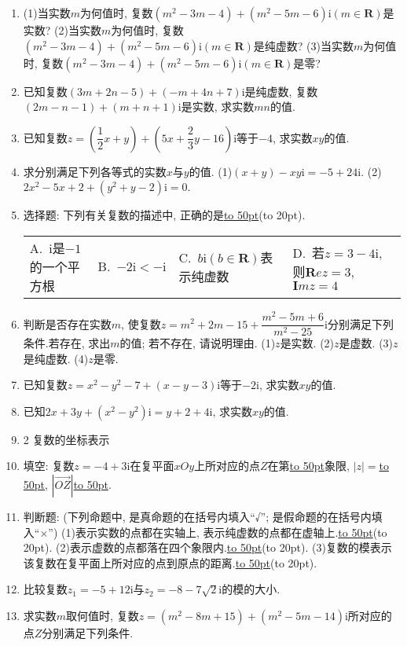 \documentclass[10pt,a4paper]{article}
\newcommand{\blank}[1]{\underline{\hbox to #1pt{}}}
\newcommand{\bracket}[1]{(\hbox to #1pt{})}
\newcommand{\fourch}[4]{\par\begin{tabular}{p{.23\textwidth}p{.23\textwidth}p{.23\textwidth}p{.23\textwidth}}
A.~#1 &B.~#2& C.~#3& D.~#4
\end{tabular}}
\begin{document}
\begin{enumerate}[1.]
\fourch{$a=0,b\ne 0$}{$a\ne 0,b\in \mathbf{R}$}{$a\ne 0,b\ne 0$}{$a\in \mathbf{R},b\ne 0$}
(2)已知复数$z_1=a+b\mathrm{i}(ab\in \mathbf{R})$和复数$z_2=c+d\mathrm{i}(cd\in \mathbf{R})$.``$a=c$''是``$z_1=z_2$''的\blank{50}\bracket{20}.
\fourch{充分非必要条件}{必要非充分条件}{充要条件}{既非充分又非必要条件}
\item (1)当实数$m$为何值时, 复数$(m^2-3m-4)+(m^2-5m-6)\mathrm{i}(m\in \mathbf{R})$是实数?
(2)当实数$m$为何值时, 复数$(m^2-3m-4)+(m^2-5m-6)\mathrm{i}(m\in \mathbf{R})$是纯虚数?
(3)当实数$m$为何值时, 复数$(m^2-3m-4)+(m^2-5m-6)\mathrm{i}(m\in \mathbf{R})$是零?
\item 已知复数$(3m+2n-5)+(-m+4n+7)\mathrm{i}$是纯虚数, 复数$(2m-n-1)+(m+n+1)\mathrm{i}$是实数, 求实数$mn$的值.
\item 已知复数$z=(\dfrac 12x+y)+(5x+\dfrac 23y-16)\mathrm{i}$等于$-4$, 求实数$xy$的值.
\item 求分别满足下列各等式的实数$x$与$y$的值.
(1)$(x+y)-xy\mathrm{i}=-5+24\mathrm{i}$.
(2)$2x^2-5x+2+(y^2+y-2)\mathrm{i}=0$.
\item 选择题:
下列有关复数的描述中, 正确的是\blank{50}\bracket{20}.
\fourch{$\mathrm{i}$是$-1$的一个平方根}{$-2\mathrm{i}<-\mathrm{i}$}{$b\mathrm{i}(b\in \mathbf{R})$表示纯虚数}{若$z=3-4\mathrm{i}$, 则$\mathbf Rez=3$, $\mathbf Imz=4$}
\item 判断是否存在实数$m$, 使复数$z=m^2+2m-15+\dfrac{{m^2}-5m+6}{{m^2}-25}\mathrm{i}$分别满足下列条件.若存在, 求出$m$的值; 若不存在, 请说明理由.
(1)$z$是实数.
(2)$z$是虚数.
(3)$z$是纯虚数.
(4)$z$是零.
\item 已知复数$z=x^2-y^2-7+(x-y-3)\mathrm{i}$等于$-2\mathrm{i}$, 求实数$xy$的值.
\item 已知$2x+3y+(x^2-y^2)\mathrm{i}=y+2+4\mathrm{i}$, 求实数$xy$的值.
\item 2  复数的坐标表示
\item 填空:
复数$z=-4+3\mathrm{i}$在复平面$xOy$上所对应的点$Z$在第\blank{50}象限, $|z|=$\blank{50}, $|\overrightarrow{OZ}|$\blank{50}.
\item 判断题: (下列命题中, 是真命题的在括号内填入``√''; 是假命题的在括号内填入``×'')
(1)表示实数的点都在实轴上, 表示纯虚数的点都在虚轴上.\blank{50}\bracket{20}.
(2)表示虚数的点都落在四个象限内.\blank{50}\bracket{20}.
(3)复数的模表示该复数在复平面上所对应的点到原点的距离.\blank{50}\bracket{20}.
\item 比较复数$z_1=-5+12\mathrm{i}$与$z_2=-8-7\sqrt 2\mathrm{i}$的模的大小.
\item 求实数$m$取何值时, 复数$z=(m^2-8m+15)+(m^2-5m-14)\mathrm{i}$所对应的点$Z$分别满足下列条件.

\end{enumerate}
\end{document}
